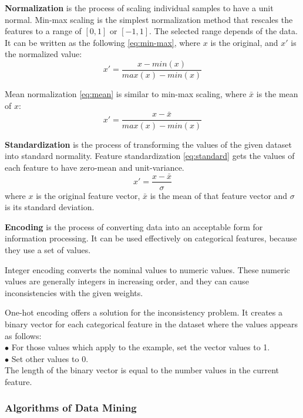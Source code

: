 \textbf{Normalization} is the process of scaling individual samples to have a unit normal. Min-max scaling is the simplest normalization method that rescales the features to a range of $[0, 1]$ or $[-1, 1]$. The selected range depends of the data. It can be written as the following \eqref{eq:min-max}, where $x$ is the original, and $x'$ is the normalized value:
\begin{equation} x' = \frac{x-min(x)}{max(x)-min(x)} \label{eq:min-max} \end{equation} 

\smallskip \noindent Mean normalization \eqref{eq:mean} is similar to min-max scaling, where $\bar x$ is the mean of $x$:
\begin{equation} x' = \frac{x-\bar x}{max(x)-min(x)} \label{eq:mean} \end{equation} \medskip

\textbf{Standardization} is the process of transforming the values of the given dataset into standard normality. Feature standardization \eqref{eq:standard} gets the values of each feature to have zero-mean and unit-variance. 
\begin{equation}  x'= \frac{x-\bar x}{\sigma} \label{eq:standard} \end{equation}
where $x$ is the original feature vector, $\bar x$ is the mean of that feature vector and $\sigma$ is its standard deviation.\bigskip

\textbf{Encoding} is the process of converting data into an acceptable form for information processing. It can be used effectively on categorical features, because they use a set of values. \smallskip

Integer encoding converts the nominal values to numeric values. These numeric values are generally integers in increasing order, and they can cause inconsistencies with the given weights.\smallskip

One-hot encoding offers a solution for the inconsistency problem. It creates a binary vector for each categorical feature in the dataset where the values appears as follows:\\
$\bullet$ For those values which apply to the example, set the vector values to 1.\\
$\bullet$ Set other values to 0.\\
The length of the binary vector is equal to the number values in the current feature.


\subsubsection{Algorithms of Data Mining}

